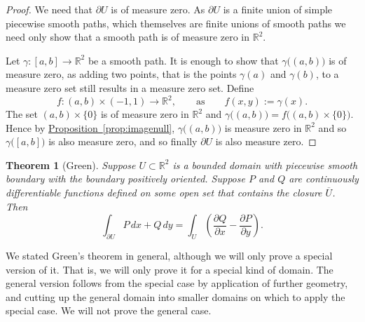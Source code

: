 \documentclass[12pt]{book}
\newcommand{\snorm}[1]{\lVert {#1} \rVert}
\newcommand{\R}{{\mathbb{R}}}
\theoremstyle{plain}
\newtheorem{thm}{Theorem}[section]
\theoremstyle{remark}
\theoremstyle{definition}
\theoremstyle{exercise}
\theoremstyle{example}
\newcommand{\propref}[1]{\hyperref[#1]{Proposition~\ref*{#1}}}
\begin{document}
\begin{proof}
We need that $\partial U$ is of measure zero.  As $\partial U$ is a finite
union of simple piecewise smooth paths, which themselves
are finite unions of smooth paths we need only show that 
a smooth path is of measure zero in $\R^2$.

Let $\gamma \colon [a,b] \to \R^2$ be a smooth path.
It is enough to show that
$\gamma\bigl((a,b)\bigr)$ is of measure zero, as adding two points,
that is the points $\gamma(a)$ and $\gamma(b)$,
to a measure zero set still results in a measure zero set.
Define
\begin{equation*}
f \colon (a,b) \times (-1,1) \to \R^2,
\qquad \text{as} \qquad
f(x,y) := \gamma(x) .
\end{equation*}
The set $(a,b) \times \{ 0 \}$ is of measure zero in $\R^2$ and
$\gamma\bigl((a,b)\bigr) = f\bigl( (a,b) \times \{ 0 \} \bigr)$.
Hence by \propref{prop:imagenull}, 
$\gamma\bigl((a,b)\bigr)$ is measure zero in $\R^2$
and so
$\gamma\bigl([a,b]\bigr)$ is also measure zero, and 
so finally $\partial U$ is also measure zero.
\end{proof}

\begin{thm}[Green]
Suppose $U \subset \R^2$ is a bounded domain with piecewise smooth boundary with
the boundary positively oriented.  Suppose $P$ and $Q$ are continuously
differentiable functions defined on some open set that contains the closure
$\overline{U}$.  Then
\begin{equation*}
\int_{\partial U}
P \, dx + Q\,  dy
=
\int_{U}
\left(\frac{\partial Q}{\partial x} - \frac{\partial P}{\partial y} \right)
.
\end{equation*}
\end{thm}

We stated Green's theorem in general, although we will only prove a special 
version of it.  That is, we will only prove it for a special kind of domain.
The general version follows from the special case 
by application of further geometry, and cutting up the general
domain into smaller domains on which to apply the special case.
We will not prove the general case. 
\end{document}
